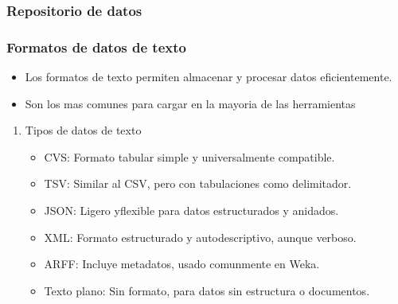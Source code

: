 \documentclass[11pt]{article}
\begin{document}
\subsubsection{Repositorio de datos}
\label{sec:org3b87195}
\subsubsection{Formatos de datos de texto}
\label{sec:org9de4795}
\begin{itemize}
\item Los formatos de texto permiten almacenar y procesar datos eficientemente.
\item Son los mas comunes para cargar en la mayoria de las herramientas
\end{itemize}
\begin{enumerate}
\item Tipos de datos de texto
\label{sec:orgf4a1ac3}
\begin{itemize}
\item CVS: Formato tabular simple y universalmente compatible.
\item TSV: Similar al CSV, pero con tabulaciones como delimitador.
\item JSON: Ligero yflexible para datos estructurados y anidados.
\item XML: Formato estructurado y autodescriptivo, aunque verboso.
\item ARFF: Incluye metadatos, usado comunmente en Weka.
\item Texto plano: Sin formato, para datos sin estructura o documentos.
\end{itemize}
\end{enumerate}
\end{document}
